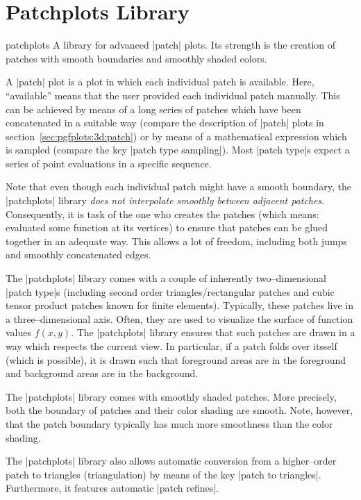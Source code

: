 \section{Patchplots Library}
{
%
\label{sec:lib:patchplots}
\begin{pgfplotslibrary}{patchplots}
	A library for advanced |patch| plots. Its strength is the creation of patches with smooth boundaries and smoothly shaded colors.
	
	A |patch| plot is a plot in which each individual patch is available. Here, ``available'' means that the user provided each individual patch manually. This can be achieved by means of a long series of patches which have been concatenated in a suitable way (compare the description of |patch| plots in section~\ref{sec:pgfplots:3d:patch}) or by means of a mathematical expression which is sampled (compare the key |patch type sampling|). Most |patch type|s expect a series of point evaluations in a specific sequence.
	
	Note that even though each individual patch might have a smooth boundary, the |patchplots| library \emph{does not interpolate smoothly between adjacent patches}. Consequently, it is task of the one who creates the patches (which means: evaluated some function at its vertices) to ensure that patches can be glued together in an adequate way. This allows a lot of freedom, including both jumps and smoothly concatenated edges. 

	The |patchplots| library comes with a couple of inherently two--dimensional |patch type|s (including second order triangles/rectangular patches and cubic tensor product patches known for finite elements). Typically, these patches live in a three--dimensional axis. Often, they are used to visualize the surface of function values $f(x,y)$. The |patchplots| library ensures that such patches are drawn in a way which respects the current view. In particular, if a patch folds over itsself (which is possible), it is drawn such that foreground areas are in the foreground and background areas are in the background.

	The |patchplots| library comes with smoothly shaded patches. More precisely, both the boundary of patches and their color shading are smooth. Note, however, that the patch boundary typically has much more smoothness than the color shading. 

	The |patchplots| library also allows automatic conversion from a higher--order patch to triangles (triangulation) by means of the key |patch to triangles|. Furthermore, it features automatic |patch refines|.


\end{pgfplotslibrary}}
